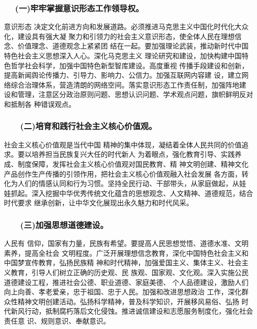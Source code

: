 \documentclass[11pt]{ctexart}
\begin{document}
{{{{\subsubsection{　 (一)牢牢掌握意识形态工作领导权。}
\label{sec:orgd3dcfe5}

意识形态
决定文化前进方向和发展道路。必须推进马克思主义中国化时代化大众化，建设具有强大凝
聚力和引领力的社会主义意识形态，使全体人民在理想信念、价值理念、道德观念上紧紧团
结在一起。要加强理论武装，推动新时代中国特色社会主义思想深入人心。深化马克思主义
理论研究和建设，加快构建中国特色哲学社会科学，加强中国特色新型智库建设。高度重视
传播手段建设和创新，提高新闻舆论传播力、引导力、影响力、公信力。加强互联网内容建
设，建立网络综合治理体系，营造清朗的网络空间。落实意识形态工作责任制，加强阵地建
设和管理，注意区分政治原则问题、思想认识问题、学术观点问题，旗帜鲜明反对和抵制各
种错误观点。

\subsubsection{　　(二)培育和践行社会主义核心价值观。}
\label{sec:orgb702b98}

社会主义核心价值观是当代中国
精神的集中体现，凝结着全体人民共同的价值追求。要以培养担当民族复兴大任的时代新人
为着眼点，强化教育引导、实践养成、制度保障，发挥社会主义核心价值观对国民教育、精
神文明创建、精神文化产品创作生产传播的引领作用，把社会主义核心价值观融入社会发展
各方面，转化为人们的情感认同和行为习惯。坚持全民行动、干部带头，从家庭做起，从娃
娃抓起。深入挖掘中华优秀传统文化蕴含的思想观念、人文精神、道德规范，结合时代要求
继承创新，让中华文化展现出永久魅力和时代风采。

\subsubsection{　　(三)加强思想道德建设。}
\label{sec:org70f9e16}

人民有
信仰，国家有力量，民族有希望。要提高人民思想觉悟、道德水准、文明素养，提高全社会
文明程度。广泛开展理想信念教育，深化中国特色社会主义和中国梦宣传教育，弘扬民族精
神和时代精神，加强爱国主义、集体主义、社会主义教育，引导人们树立正确的历史观、民
族观、国家观、文化观。深入实施公民道德建设工程，推进社会公德、职业道德、家庭美德、
个人品德建设，激励人们向上向善、孝老爱亲，忠于祖国、忠于人民。加强和改进思想政治
工作，深化群众性精神文明创建活动。弘扬科学精神，普及科学知识，开展移风易俗、弘扬
时代新风行动，抵制腐朽落后文化侵蚀。推进诚信建设和志愿服务制度化，强化社会责任意
识、规则意识、奉献意识。

}}}}
\end{document}
